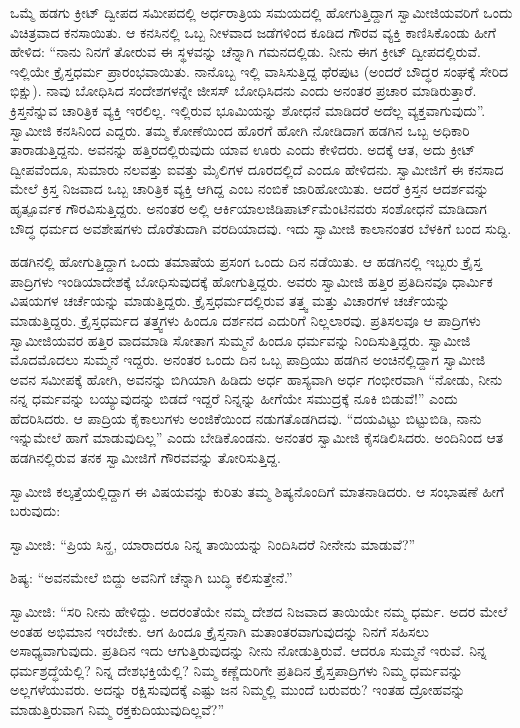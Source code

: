 \vskip 3pt

 ಒಮ್ಮೆ ಹಡಗು ಕ್ರೀಟ್ ದ್ವೀಪದ ಸಮೀಪದಲ್ಲಿ ಅರ್ಧರಾತ್ರಿಯ ಸಮಯದಲ್ಲಿ ಹೋಗುತ್ತಿದ್ದಾಗ ಸ್ವಾಮೀಜಿಯವರಿಗೆ ಒಂದು ವಿಚಿತ್ರವಾದ ಕನಸಾಯಿತು. ಆ ಕನಸಿನಲ್ಲಿ ಒಬ್ಬ ನೀಳವಾದ ಜಡೆಗಳಿಂದ ಕೂಡಿದ ಗೌರವ ವ್ಯಕ್ತಿ ಕಾಣಿಸಿಕೊಂಡು ಹೀಗೆ ಹೇಳಿದ: “ನಾನು ನಿನಗೆ ತೋರುವ ಈ ಸ್ಥಳವನ್ನು ಚೆನ್ನಾಗಿ ಗಮನದಲ್ಲಿಡು. ನೀನು ಈಗ ಕ್ರೀಟ್ ದ್ವೀಪದಲ್ಲಿರುವೆ. ಇಲ್ಲಿಯೇ ಕ್ರೈಸ್ತಧರ್ಮ ಪ್ರಾರಂಭವಾಯಿತು. ನಾನೊಬ್ಬ ಇಲ್ಲಿ ವಾಸಿಸುತ್ತಿದ್ದ ಥೆರಪುಟ (ಅಂದರೆ ಬೌದ್ಧರ ಸಂಘಕ್ಕೆ ಸೇರಿದ ಭಿಕ್ಷು). ನಾವು ಬೋಧಿಸಿದ ಸಂದೇಶಗಳನ್ನೇ ಜೀಸಸ್ ಬೋಧಿಸಿದನು ಎಂದು ಅನಂತರ ಪ್ರಚಾರ ಮಾಡಿರುತ್ತಾರೆ. ಕ್ರಿಸ್ತನೆನ್ನುವ ಚಾರಿತ್ರಿಕ ವ್ಯಕ್ತಿ ಇರಲಿಲ್ಲ. ಇಲ್ಲಿರುವ ಭೂಮಿಯನ್ನು ಶೋಧನೆ ಮಾಡಿದರೆ ಅದೆಲ್ಲ ವ್ಯಕ್ತವಾಗುವುದು”. ಸ್ವಾಮೀಜಿ ಕನಸಿನಿಂದ ಎದ್ದರು. ತಮ್ಮ ಕೋಣೆಯಿಂದ ಹೊರಗೆ ಹೋಗಿ ನೋಡಿದಾಗ ಹಡಗಿನ ಒಬ್ಬ ಅಧಿಕಾರಿ ತಾರಾಡುತ್ತಿದ್ದನು. ಅವನನ್ನು ಹತ್ತಿರದಲ್ಲಿರುವುದು ಯಾವ ಊರು ಎಂದು ಕೇಳಿದರು. ಅದಕ್ಕೆ ಆತ, ಅದು ಕ್ರೀಟ್ ದ್ವೀಪವೆಂದೂ, ಸುಮಾರು ನಲವತ್ತು ಐವತ್ತು ಮೈಲಿಗಳ ದೂರದಲ್ಲಿದೆ ಎಂದೂ ಹೇಳಿದನು. ಸ್ವಾಮೀಜಿಗೆ ಈ ಕನಸಾದ ಮೇಲೆ ಕ್ರಿಸ್ತ ನಿಜವಾದ ಒಬ್ಬ ಚಾರಿತ್ರಿಕ ವ್ಯಕ್ತಿ ಆಗಿದ್ದ ಎಂಬ ನಂಬಿಕೆ ಜಾರಿಹೋಯಿತು. ಆದರೆ ಕ್ರಿಸ್ತನ ಆದರ್ಶವನ್ನು ಹೃತ್ಪೂರ್ವಕ ಗೌರವಿಸುತ್ತಿದ್ದರು. ಅನಂತರ ಅಲ್ಲಿ ಆರ್ಕಿಯಾಲಜಿ\break ಡಿಪಾರ್ಟ್‍ಮೆಂಟಿನವರು ಸಂಶೋಧನೆ ಮಾಡಿದಾಗ ಬೌದ್ಧ ಧರ್ಮದ ಅವಶೇಷಗಳು ದೊರೆತುದಾಗಿ ವರದಿಯಾದವು. ಇದು ಸ್ವಾಮೀಜಿ ಕಾಲಾನಂತರ ಬೆಳಕಿಗೆ ಬಂದ ಸುದ್ದಿ. 

\vskip 3pt

 ಹಡಗಿನಲ್ಲಿ ಹೋಗುತ್ತಿದ್ದಾಗ ಒಂದು ತಮಾಷೆಯ ಪ್ರಸಂಗ ಒಂದು ದಿನ ನಡೆಯಿತು. ಆ ಹಡಗಿನಲ್ಲಿ ಇಬ್ಬರು ಕ್ರೈಸ್ತ ಪಾದ್ರಿಗಳು ಇಂಡಿಯಾದೇಶಕ್ಕೆ ಬೋಧಿಸುವುದಕ್ಕೆ ಹೋಗುತ್ತಿದ್ದರು. ಅವರು ಸ್ವಾಮೀಜಿ ಹತ್ತಿರ ಪ್ರತಿದಿನವೂ ಧಾರ್ಮಿಕ ವಿಷಯಗಳ ಚರ್ಚೆಯನ್ನು ಮಾಡುತ್ತಿದ್ದರು. ಕ್ರೈಸ್ತಧರ್ಮದಲ್ಲಿರುವ ತತ್ತ್ವ ಮತ್ತು ವಿಚಾರಗಳ ಚರ್ಚೆಯನ್ನು ಮಾಡುತ್ತಿದ್ದರು. ಕ್ರೈಸ್ತಧರ್ಮದ ತತ್ತ್ವಗಳು ಹಿಂದೂ ದರ್ಶನದ ಎದುರಿಗೆ ನಿಲ್ಲಲಾರವು. ಪ್ರತಿಸಲವೂ ಆ ಪಾದ್ರಿಗಳು ಸ್ವಾಮೀಜಿಯವರ ಹತ್ತಿರ ವಾದಮಾಡಿ ಸೋತಾಗ ಸುಮ್ಮನೆ ಹಿಂದೂ ಧರ್ಮವನ್ನು ನಿಂದಿಸುತ್ತಿದ್ದರು. ಸ್ವಾಮೀಜಿ ಮೊದಮೊದಲು ಸುಮ್ಮನೆ ಇದ್ದರು. ಅನಂತರ ಒಂದು ದಿನ ಒಬ್ಬ ಪಾದ್ರಿಯು ಹಡಗಿನ ಅಂಚಿನಲ್ಲಿದ್ದಾಗ ಸ್ವಾಮೀಜಿ ಅವನ ಸಮೀಪಕ್ಕೆ ಹೋಗಿ, ಅವನನ್ನು ಬಿಗಿಯಾಗಿ ಹಿಡಿದು ಅರ್ಧ ಹಾಸ್ಯವಾಗಿ ಅರ್ಧ ಗಂಭೀರವಾಗಿ “ನೋಡು, ನೀನು ನನ್ನ ಧರ್ಮವನ್ನು ಬಯ್ಯುವುದನ್ನು ಬಿಡದೆ ಇದ್ದರೆ ನಿನ್ನನ್ನು ಹೀಗೆಯೇ ಸಮುದ್ರಕ್ಕೆ ನೂಕಿ ಬಿಡುವೆ!” ಎಂದು ಹೆದರಿಸಿದರು. ಆ ಪಾದ್ರಿಯ ಕೈಕಾಲುಗಳು ಅಂಜಿಕೆಯಿಂದ ನಡುಗತೊಡಗಿದವು. “ದಯವಿಟ್ಟು ಬಿಟ್ಟುಬಿಡಿ, ನಾನು ಇನ್ನುಮೇಲೆ ಹಾಗೆ ಮಾಡುವುದಿಲ್ಲ” ಎಂದು ಬೇಡಿಕೊಂಡನು. ಅನಂತರ ಸ್ವಾಮೀಜಿ ಕೈಸಡಿಲಿಸಿದರು. ಅಂದಿನಿಂದ ಆತ ಹಡಗಿನಲ್ಲಿರುವ ತನಕ ಸ್ವಾಮೀಜಿಗೆ ಗೌರವವನ್ನು ತೋರಿಸುತ್ತಿದ್ದ. 

 ಸ್ವಾಮೀಜಿ ಕಲ್ಕತ್ತೆಯಲ್ಲಿದ್ದಾಗ ಈ ವಿಷಯವನ್ನು ಕುರಿತು ತಮ್ಮ ಶಿಷ್ಯನೊಂದಿಗೆ ಮಾತನಾಡಿದರು. ಆ ಸಂಭಾಷಣೆ ಹೀಗೆ ಬರುವುದು: 

 ಸ್ವಾಮೀಜಿ: “ಪ್ರಿಯ ಸಿನ್ಹ, ಯಾರಾದರೂ ನಿನ್ನ ತಾಯಿಯನ್ನು ನಿಂದಿಸಿದರೆ ನೀನೇನು ಮಾಡುವೆ?” 

 ಶಿಷ್ಯ: “ಅವನಮೇಲೆ ಬಿದ್ದು ಅವನಿಗೆ ಚೆನ್ನಾಗಿ ಬುದ್ಧಿ ಕಲಿಸುತ್ತೇನೆ.” 

 ಸ್ವಾಮೀಜಿ: “ಸರಿ ನೀನು ಹೇಳಿದ್ದು. ಅದರಂತೆಯೇ ನಮ್ಮ ದೇಶದ ನಿಜವಾದ ತಾಯಿಯೇ ನಮ್ಮ ಧರ್ಮ. ಅದರ ಮೇಲೆ ಅಂತಹ ಅಭಿಮಾನ ಇರಬೇಕು. ಆಗ ಹಿಂದೂ ಕ್ರೈಸ್ತನಾಗಿ ಮತಾಂತರವಾಗುವುದನ್ನು ನಿನಗೆ ಸಹಿಸಲು ಅಸಾಧ್ಯವಾಗುವುದು. ಪ್ರತಿದಿನ ಇದು ಆಗುತ್ತಿರುವುದನ್ನು ನೀನು ನೋಡುತ್ತಿರುವೆ. ಆದರೂ ಸುಮ್ಮನೆ ಇರುವೆ. ನಿನ್ನ ಧರ್ಮಶ್ರದ್ಧೆಯೆಲ್ಲಿ? ನಿನ್ನ ದೇಶಭಕ್ತಿಯೆಲ್ಲಿ? ನಿಮ್ಮ ಕಣ್ಣೆದುರಿಗೇ ಪ್ರತಿದಿನ ಕ್ರೈಸ್ತಪಾದ್ರಿಗಳು ನಿಮ್ಮ ಧರ್ಮವನ್ನು ಅಲ್ಲಗಳೆಯುವರು. ಅದನ್ನು ರಕ್ಷಿಸುವುದಕ್ಕೆ ಎಷ್ಟು ಜನ ನಿಮ್ಮಲ್ಲಿ ಮುಂದೆ ಬರುವರು? ಇಂತಹ ದ್ರೋಹವನ್ನು ಮಾಡುತ್ತಿರುವಾಗ ನಿಮ್ಮ ರಕ್ತ\break ಕುದಿಯುವುದಿಲ್ಲವೆ?” 

